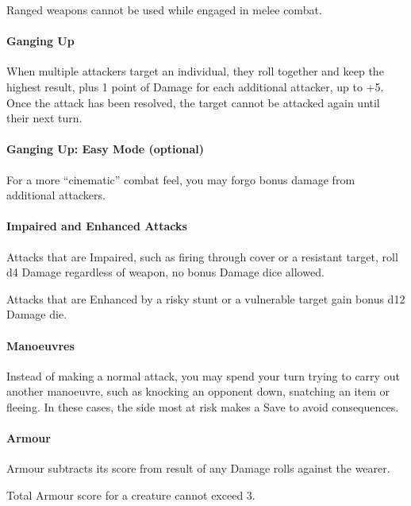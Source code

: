 \documentclass[itdr]{subfiles}
\begin{document}
Ranged weapons cannot be used while engaged in melee combat.

\paragraph{Ganging Up}
When multiple attackers target an individual, they roll together and keep the highest result, plus 1 point of Damage for each additional attacker, up to +5. Once the attack has been resolved, the target cannot be attacked again until their next turn.

\vfill
\begin{dbox}
\paragraph{Ganging Up: Easy Mode (optional)}
For a more ``cinematic'' combat feel, you may forgo bonus damage from additional attackers.
\end{dbox}
\vfill
\break

\paragraph{Impaired and Enhanced Attacks}
Attacks that are Impaired, such as firing through cover or a resistant target, roll d4 Damage regardless of weapon, no bonus Damage dice allowed.

Attacks that are Enhanced by a risky stunt or a vulnerable target gain bonus d12 Damage die.

\paragraph{Manoeuvres}
Instead of making a normal attack, you may spend your turn trying to carry out another manoeuvre, such as knocking an opponent down, snatching an item or fleeing. In these cases, the side most at risk makes a Save to avoid consequences.

\paragraph{Armour}
Armour subtracts its score from result of any Damage rolls against the wearer.

Total Armour score for a creature cannot exceed 3.
\end{document}

